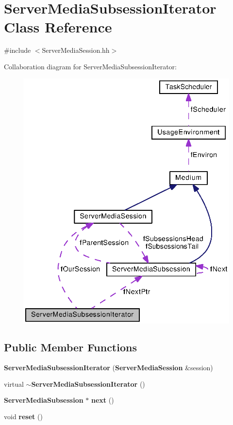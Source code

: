 \section{Server\+Media\+Subsession\+Iterator Class Reference}
\label{classServerMediaSubsessionIterator}


{\ttfamily \#include $<$Server\+Media\+Session.\+hh$>$}



Collaboration diagram for Server\+Media\+Subsession\+Iterator\+:
\nopagebreak
\begin{figure}[H]
\begin{center}
\leavevmode
\includegraphics[width=341pt]{classServerMediaSubsessionIterator__coll__graph}
\end{center}
\end{figure}
\subsection*{Public Member Functions}
\begin{DoxyCompactItemize}
\item 
{\bf Server\+Media\+Subsession\+Iterator} ({\bf Server\+Media\+Session} \&session)
\item 
virtual {\bf $\sim$\+Server\+Media\+Subsession\+Iterator} ()
\item 
{\bf Server\+Media\+Subsession} $\ast$ {\bf next} ()
\item 
void {\bf reset} ()
\end{DoxyCompactItemize}
